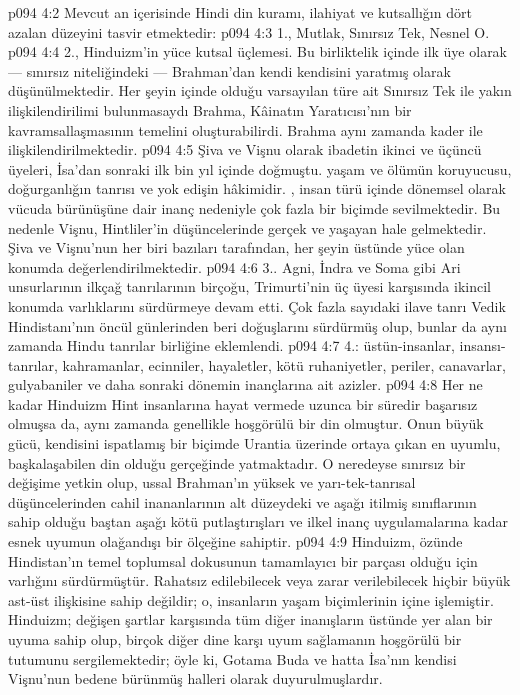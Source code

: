 \vs p094 4:2 Mevcut an içerisinde Hindi din kuramı, ilahiyat ve kutsallığın dört azalan düzeyini tasvir etmektedir:
\vs p094 4:3 1.\bibnobreakspace {}, Mutlak, Sınırsız Tek, Nesnel O.
\vs p094 4:4 2.\bibnobreakspace {}, Hinduizm’in yüce kutsal üçlemesi. Bu birliktelik içinde ilk üye olarak  --- sınırsız niteliğindeki --- Brahman’dan kendi kendisini yaratmış olarak düşünülmektedir. Her şeyin içinde olduğu varsayılan türe ait Sınırsız Tek ile yakın ilişkilendirilimi bulunmasaydı Brahma, Kâinatın Yaratıcısı’nın bir kavramsallaşmasının temelini oluşturabilirdi. Brahma aynı zamanda kader ile ilişkilendirilmektedir.
\vs p094 4:5 Şiva ve Vişnu olarak ibadetin ikinci ve üçüncü üyeleri, İsa’dan sonraki ilk bin yıl içinde doğmuştu.  yaşam ve ölümün koruyucusu, doğurganlığın tanrısı ve yok edişin hâkimidir. , insan türü içinde dönemsel olarak vücuda bürünüşüne dair inanç nedeniyle çok fazla bir biçimde sevilmektedir. Bu nedenle Vişnu, Hintliler’in düşüncelerinde gerçek ve yaşayan hale gelmektedir. Şiva ve Vişnu’nun her biri bazıları tarafından, her şeyin üstünde yüce olan konumda değerlendirilmektedir.
\vs p094 4:6 3.\bibnobreakspace {}. Agni, İndra ve Soma gibi Ari unsurlarının ilkçağ tanrılarının birçoğu, Trimurti’nin üç üyesi karşısında ikincil konumda varlıklarını sürdürmeye devam etti. Çok fazla sayıdaki ilave tanrı Vedik Hindistanı’nın öncül günlerinden beri doğuşlarını sürdürmüş olup, bunlar da aynı zamanda Hindu tanrılar birliğine eklemlendi.
\vs p094 4:7 4.\bibnobreakspace {}: üstün\hyp{}insanlar, insansı\hyp{}tanrılar, kahramanlar, ecinniler, hayaletler, kötü ruhaniyetler, periler, canavarlar, gulyabaniler ve daha sonraki dönemin inançlarına ait azizler.
\vs p094 4:8 Her ne kadar Hinduizm Hint insanlarına hayat vermede uzunca bir süredir başarısız olmuşsa da, aynı zamanda genellikle hoşgörülü bir din olmuştur. Onun büyük gücü, kendisini ispatlamış bir biçimde Urantia üzerinde ortaya çıkan en uyumlu, başkalaşabilen din olduğu gerçeğinde yatmaktadır. O neredeyse sınırsız bir değişime yetkin olup, ussal Brahman’ın yüksek ve yarı\hyp{}tek\hyp{}tanrısal düşüncelerinden cahil inananlarının alt düzeydeki ve aşağı itilmiş sınıflarının sahip olduğu baştan aşağı kötü putlaştırışları ve ilkel inanç uygulamalarına kadar esnek uyumun olağandışı bir ölçeğine sahiptir.
\vs p094 4:9 Hinduizm, özünde Hindistan’ın temel toplumsal dokusunun tamamlayıcı bir parçası olduğu için varlığını sürdürmüştür. Rahatsız edilebilecek veya zarar verilebilecek hiçbir büyük ast\hyp{}üst ilişkisine sahip değildir; o, insanların yaşam biçimlerinin içine işlemiştir. Hinduizm; değişen şartlar karşısında tüm diğer inanışların üstünde yer alan bir uyuma sahip olup, birçok diğer dine karşı uyum sağlamanın hoşgörülü bir tutumunu sergilemektedir; öyle ki, Gotama Buda ve hatta İsa’nın kendisi Vişnu’nun bedene bürünmüş halleri olarak duyurulmuşlardır.
